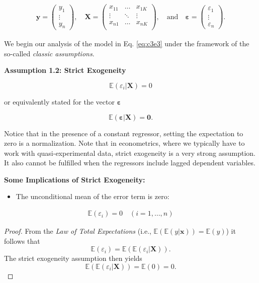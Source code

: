 \documentclass[]{book}
\providecommand{\tightlist}{%
  \setlength{\itemsep}{0pt}\setlength{\parskip}{0pt}}
\theoremstyle{definition}
\theoremstyle{definition}
\theoremstyle{definition}
\theoremstyle{remark}
\let\BeginKnitrBlock\begin \let\EndKnitrBlock\end
\begin{document}
\[
\begin{align*}
\mathbf{y} = \left(\begin{matrix}y_1\\ \vdots\\y_n\end{matrix}\right),\quad
\mathbf{X} = \left( \begin{matrix}
x_{11} & \dots & x_{1K} \\ \vdots & \ddots & \vdots \\ x_{n1} &\dots&x_{nK}\\
\end{matrix}\right),\quad\text{and}\quad \boldsymbol{\varepsilon}=\left(\begin{matrix}\varepsilon_1\\ \vdots\\ \varepsilon_n\end{matrix}\right).
\end{align*}
\]

We begin our analysis of the model in Eq. \eqref{eq:c3e3} under the framework of the so-called \emph{classic assumptions}.

\textbf{Assumption 1.2: Strict Exogeneity}

\[\mathbb{E}(\varepsilon_i|\mathbf{X}) = 0\]

or equivalently stated for the vector \(\boldsymbol{\varepsilon}\)

\[\mathbb{E}(\boldsymbol{\varepsilon}|\mathbf{X}) = \mathbf{0}.\]

Notice that in the presence of a constant regressor, setting the expectation to zero is a normalization. Note that in econometrics, where we typically have to work with quasi-experimental data, strict exogeneity is a very strong assumption. It also cannot be fulfilled when the regressors include lagged dependent variables.

\textbf{Some Implications of Strict Exogeneity:}

\begin{itemize}
\tightlist
\item
  The unconditional mean of the error term is zero:
\end{itemize}

\[
\begin{align*} 
\mathbb{E}(\varepsilon_i) = 0\quad(i=1,\dots,n)
\label{eq:c3e4}
\end{align*}
\]

\BeginKnitrBlock{proof}
{}From the \emph{Law of Total Expectations} (i.e., \(\mathbb{E}(\mathbb{E}(y|\mathbf{x}))=\mathbb{E}(y)\)) it follows that
\[\mathbb{E}(\varepsilon_i)=\mathbb{E}(\mathbb{E}(\varepsilon_i|\mathbf{X})).\]
The strict exogeneity assumption then yields \[\mathbb{E}(\mathbb{E}(\varepsilon_i|\mathbf{X}))=\mathbb{E}(0)=0.\]
\EndKnitrBlock{proof}
\end{document}
